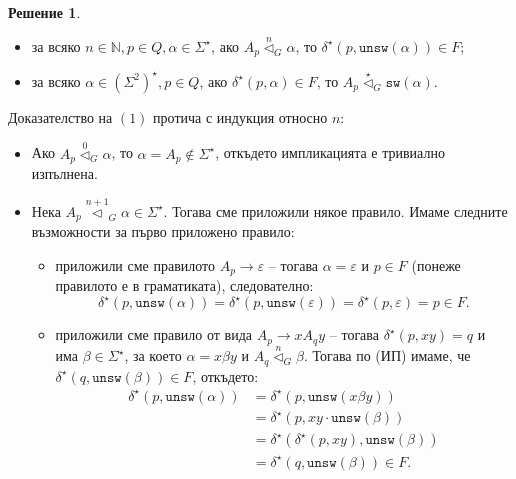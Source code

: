 \documentclass[12pt]{article}
\newcommand{\N}{\mathbb{N}}
\newcommand{\tri}[1]{\stackrel{#1}{\vartriangleleft}}
\theoremstyle{definition}
\newtheorem*{solution}{Решение}
\begin{document}
\begin{solution}
\begin{itemize}
    \item[$(1)$] за всяко $n \in \N, p \in Q, \alpha \in \Sigma^\star$, ако $A_p \tri{n}_G \alpha$, то $\delta^\star(p, \texttt{unsw}(\alpha)) \in F$;
    \item[$(2)$] за всяко $\alpha \in (\Sigma^2)^\star, p \in Q$, ако $\delta^\star(p, \alpha) \in F$, то $A_p \tri{\star}_G \texttt{sw}(\alpha)$.
  \end{itemize}
  Доказателство на $(1)$ протича с индукция относно $n$:
  \begin{itemize}
    \item[(База)] Ако $A_p \tri{0}_G \alpha$, то $\alpha = A_p \notin \Sigma^\star$, откъдето импликацията е тривиално изпълнена.
    \item[(ИС)] Нека $A_p \tri{n + 1}_G \alpha \in \Sigma^\star$.
                Тогава сме приложили някое правило.
                Имаме следните възможности за първо приложено правило:
                \begin{itemize}
                  \item[1 сл.] приложили сме правилото $A_p \rightarrow \varepsilon$ -- тогава $\alpha = \varepsilon$ и $p \in F$ (понеже правилото е в граматиката), следователно:
                               \[
                                 \delta^\star(p, \texttt{unsw}(\alpha)) = \delta^\star(p, \texttt{unsw}(\varepsilon)) = \delta^\star(p, \varepsilon) = p \in F.
                               \]
                  \item[2 сл.] приложили сме правило от вида $A_p \rightarrow x A_q y$ -- тогава $\delta^\star(p, xy) = q$ и има $\beta \in \Sigma^\star$, за което $\alpha = x \beta y$ и $A_q \tri{n}_G \beta$.
                               Тогава по (ИП) имаме, че $\delta^\star(q, \texttt{unsw}(\beta)) \in F$, откъдето:
                               \begin{align*}
                                 \delta^\star(p, \texttt{unsw}(\alpha)) &= \delta^\star(p, \texttt{unsw}(x \beta y)) \\ 
                                                                        &= \delta^\star(p, x y \cdot \texttt{unsw}(\beta)) \\ 
                                                                        &= \delta^\star(\delta^\star(p, x y), \texttt{unsw}(\beta)) \\ 
                                                                        &= \delta^\star(q, \texttt{unsw}(\beta)) \in F.
                               \end{align*}
                \end{itemize}
  \end{itemize}


\end{solution}
\end{document}
